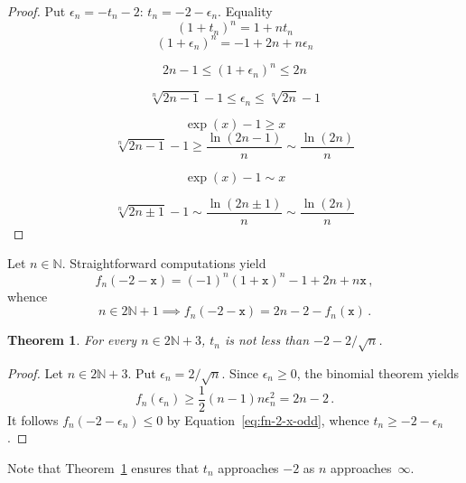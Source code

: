 \documentclass[12pt]{article}
\newcommand{\bN}{\mathbb{N}}
\newcommand{\ttx}{\mathtt{x}}
\newtheorem{theorem}{Theorem}
\begin{document}
\begin{proof}
  Put $\epsilon_n = - t_n - 2$: $t_n = - 2 - \epsilon_n$.
  Equality
  $$
  {(1 + t_n)}^n = 1 + n t_n 
  $$
  $$
   {(1 + \epsilon_n)}^n  = - 1 + 2 n + n \epsilon_n 
   $$

   $$
   2 n - 1 \le {(1 + \epsilon_n)}^n  \le  2 n 
   $$

   $$
   \sqrt[n]{2 n - 1} - 1 \le \epsilon_n  \le \sqrt[n]{2 n} - 1
   $$

   $$
   \exp(x) - 1 \ge x
   $$
   $$
   \sqrt[n]{2n - 1} - 1 \ge \frac{\ln(2n - 1)}{n} \sim \frac{\ln(2n)}{n} 
   $$

   $$
   \exp(x) - 1 \sim  x
   $$
   
   $$
   \sqrt[n]{2n \pm 1} - 1 \sim \frac{\ln(2n \pm 1)}{n} \sim \frac{\ln(2n)}{n} 
   $$
   
\end{proof}
Let $n \in \bN$.
Straightforward computations yield
$$
f_n(- 2 - \ttx) = {(- 1)}^n {(1 + \ttx)}^n - 1 + 2n + n \ttx \, , 
$$
whence 
\begin{equation} \label{eq:fn-2-x-odd}
  n \in 2 \bN + 1
  \implies 
 f_n(- 2 - \ttx) = 2n - 2 - f_n(\ttx)   \, .
\end{equation} 
 
\begin{theorem} \label{thm:lower-sqrt}
  For every $n \in 2 \bN + 3$, $t_n$ is not less than $- 2 - 2 / \sqrt{n}$.
\end{theorem}

\begin{proof}
  Let $n \in 2 \bN + 3$.
 Put $\epsilon_n = 2 / \sqrt{n}$.
  Since $\epsilon_n \ge 0$,
  the binomial theorem yields
  $$
  f_n(\epsilon_n ) \ge \frac{1}{2} (n - 1) n \epsilon_n^2 = 2 n - 2 \,.
  $$
  It follows $f_n(- 2 - \epsilon_n) \le 0$ by Equation~\eqref{eq:fn-2-x-odd}, whence $t_n \ge - 2 - \epsilon_n$.
\end{proof} 

Note that Theorem~\ref{thm:lower-sqrt} ensures that $t_n$ approaches $- 2$ as $n$ approaches~$\infty$.


 
  
\end{document}
